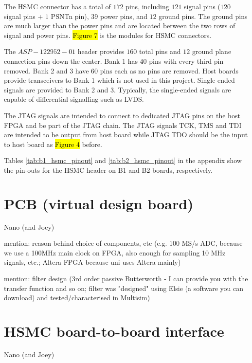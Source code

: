The HSMC connector has a total of $172$ pins, including $121$ signal pins ($120$ signal pins + $1$ PSNTn pin), $39$ power pins, and $12$ ground pins. The ground pins are much larger than the power pins and are located between the two rows of signal and power pins. \hl{Figure 7} is the modules for HSMC connectors.



The $ASP-122952-01$ header provides $160$ total pins and $12$ ground plane connection pins down the center. Bank 1 has $40$ pins with every third pin removed. Bank 2 and 3 have $60$ pins each as no pins are removed. Host boards provide transceivers to Bank 1 which is not used in this project. Single-ended signals are provided to Bank 2 and 3. Typically, the single-ended signals are capable of differential signalling such as LVDS.

The JTAG signals are intended to connect to dedicated JTAG pins on the host FPGA and be part of the JTAG chain. The JTAG signals TCK, TMS and TDI are intended to be output from host board while JTAG TDO should be the input to host board as \hl{Figure 4} before.

Tables \ref{tab:b1_hsmc_pinout} and \ref{tab:b2_hsmc_pinout} in the appendix show the pin-outs for the HSMC header on B1 and B2 boards, respectively.










\section{PCB (virtual design board)}
Nano (and Joey)

mention: reason behind choice of components, etc (e.g. 100 MS/s ADC,
because we use a 100MHz main clock on FPGA, also enough for sampling 10
MHz signals, etc.; Altera FPGA because uni uses Altera mainly)

mention: filter design (3rd order passive Butterworth - I can provide
you with the transfer function and so on; filter was "designed" using
Elsie (a software you can download) and tested/characterised in Multisim)

\section{HSMC board-to-board interface}
Nano (and Joey)

